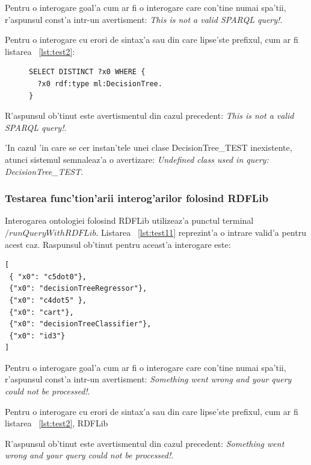 \documentclass[12pt,a4paper,twoside]{report}
\begin{document}
Pentru o interogare goal'a cum ar fi o interogare care con'tine numai spa'tii, r'aspunsul const'a intr-un avertisment:  {\it This is not a valid SPARQL query!}.

Pentru o interogare cu erori de sintax'a sau din care lipse'ste prefixul, cum ar fi listarea ~\ref{lst:test2}:

\begin{figure}[h]
\begin{footnotesize}
\begin{lstlisting}[captionpos=b, caption=Interogare SPARQL defectuoas'a, label=lst:test2,  basicstyle=\ttfamily,frame=single]
SELECT DISTINCT ?x0 WHERE {
  ?x0 rdf:type ml:DecisionTree.
}
\end{lstlisting}
\end{footnotesize}
\end{figure}


R'aspunsul ob'tinut este avertismentul din cazul precedent:  {\it This is not a valid SPARQL query!}.

'In cazul 'in care se cer instan'tele unei clase DecisionTree\_TEST inexistente, atunci sistemul semnaleaz'a o avertizare: {\it Undefined class used in query: DecisionTree\_TEST}.


\subsubsection{Testarea func'tion'arii interog'arilor folosind RDFLib}


Interogarea ontologiei folosind RDFLib utilizeaz'a punctul terminal $/runQueryWithRDFLib$.
Listarea ~\ref{lst:test11} reprezint'a o intrare valid'a pentru acest caz. Raspunsul ob'tinut pentru aceast'a interogare este:
\begin{lstlisting}[basicstyle=\footnotesize]
[
 { "x0": "c5dot0"}, 
 {"x0": "decisionTreeRegressor"}, 
 {"x0": "c4dot5" }, 
 {"x0": "cart"}, 
 {"x0": "decisionTreeClassifier"}, 
 {"x0": "id3"}
]

\end{lstlisting}

Pentru o interogare goal'a cum ar fi o interogare care con'tine numai spa'tii, r'aspunsul const'a intr-un avertisment:  {\it  Something went wrong and your query could not be processed!}.

Pentru o interogare cu erori de sintax'a sau din care lipse'ste prefixul, cum ar fi listarea ~\ref{lst:test2}, RDFLib

R'aspunsul ob'tinut este avertismentul din cazul precedent:  {\it Something went wrong and your query could not be processed!}.
\end{document}
